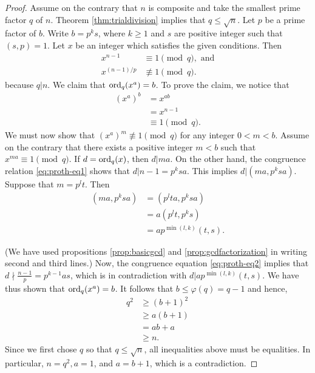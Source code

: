 \documentclass{subfiles}
\begin{document}
		\begin{proof}
			Assume on the contrary that $n$ is composite and take the smallest prime factor $q$ of $n$. Theorem \autoref{thm:trialdivision} implies that $q \leq \sqrt n$. Let $p$ be a prime factor of $b$. Write $b=p^ks$, where $k\geq 1$ and $s$ are positive integer such that $(s,p)=1$. Let $x$ be an integer which satisfies the given conditions. Then
					\begin{align}
						x^{n-1} &\equiv 1 \pmod q, \text{ and} \label{eq:proth-eq1}\\
						x^{(n-1)/p} &\not \equiv 1 \pmod q.\label{eq:proth-eq2}
					\end{align}
			because $q|n$. We claim that $\operatorname{ord}_q(x^a)=b$. To prove the claim, we notice that
				\begin{align*}
					\left(x^{a}\right)^b &= x^{ab}\\
						&= x^{n-1}\\
						&\equiv 1 \pmod q.
				\end{align*}
			We must now show that $\left(x^{a}\right)^m \not \equiv 1 \pmod q$ for any integer $0<m<b$. Assume on the contrary that there exists a positive integer $m<b$ such that $x^{ma} \equiv 1 \pmod q$. If $d=\operatorname{ord}_q(x)$, then $d|ma$. On the other hand, the congruence relation \eqref{eq:proth-eq1} shows that $d|n-1=p^ksa$. This implies $d|(ma, p^ksa)$. Suppose that $m=p^lt$. Then
				\begin{align*}
					\left(ma, p^ksa\right) &= \left(p^lta, p^ksa\right)\\
								&= a \left(p^lt, p^ks\right)\\
								&= a p^{\min(l,k)} (t,s).
				\end{align*}

			(We have used propositions \eqref{prop:basicgcd} and \eqref{prop:gcdfactorization} in writing second and third lines.) Now, the congruence equation \eqref{eq:proth-eq2} implies that $d \nmid \frac{n-1}{p}=p^{k-1}as$, which is in contradiction with $d|a p^{\min(l,k)} (t,s)$. We have thus shown that $\operatorname{ord}_q(x^a)=b$. It follows that $b \leq \varphi(q) = q-1$ and hence,
				\begin{align*}
					q^2 &\geq (b+1)^2\\
						&\geq a(b+1)\\
						&=ab+a\\
						&\geq n.
				\end{align*}
			Since we first chose $q$ so that $q \leq \sqrt n$, all inequalities above must be equalities. In particular, $n=q^2, a=1$, and $a=b+1$, which is a contradiction.
		\end{proof}
\end{document}
